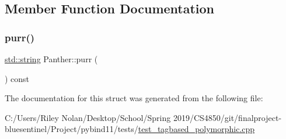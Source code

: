 \subsection{Member Function Documentation}
\mbox{\label{struct_panther_a0756bef5d80ad22cf5a65476a7c4036e}} 
\subsubsection{\texorpdfstring{purr()}{purr()}}
{\footnotesize\ttfamily \mbox{\hyperlink{_s_d_l__opengl__glext_8h_ab4ccfaa8ab0e1afaae94dc96ef52dde1}{std\+::string}} Panther\+::purr (\begin{DoxyParamCaption}{ }\end{DoxyParamCaption}) const\hspace{0.3cm}{\ttfamily [inline]}}



The documentation for this struct was generated from the following file\+:\begin{DoxyCompactItemize}
\item 
C\+:/\+Users/\+Riley Nolan/\+Desktop/\+School/\+Spring 2019/\+C\+S4850/git/finalproject-\/bluesentinel/\+Project/pybind11/tests/\mbox{\hyperlink{test__tagbased__polymorphic_8cpp}{test\+\_\+tagbased\+\_\+polymorphic.\+cpp}}\end{DoxyCompactItemize}
